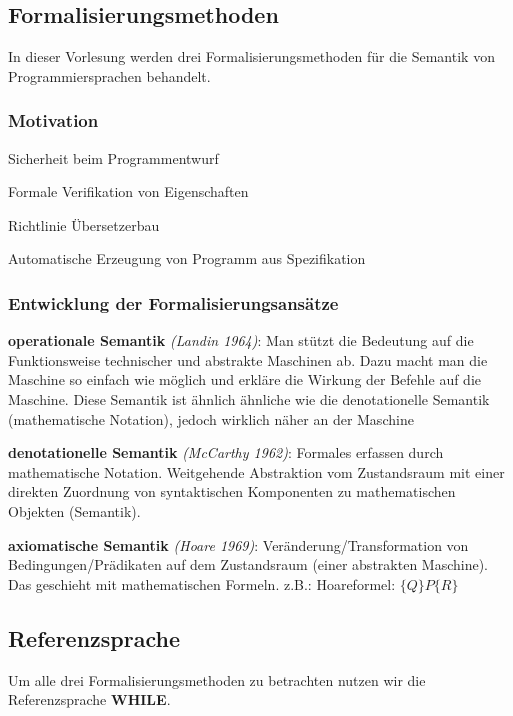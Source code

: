 \subsection{Formalisierungsmethoden}
In dieser Vorlesung werden drei Formalisierungsmethoden für die Semantik von Programmiersprachen behandelt.
\subsubsection*{Motivation}
\begin{compactitem}
	\item Sicherheit beim Programmentwurf
	\item Formale Verifikation von Eigenschaften
	\item Richtlinie Übersetzerbau
	\item Automatische Erzeugung von Programm aus Spezifikation
\end{compactitem}

\subsubsection*{Entwicklung der Formalisierungsansätze}
\begin{compactitem}
	\item [\textbf{operationale Semantik}] \emph{(Landin 1964)}:
	Man stützt die Bedeutung auf die Funktionsweise technischer und abstrakte Maschinen ab. Dazu macht man die Maschine so einfach wie möglich und erkläre die Wirkung der Befehle auf die Maschine. Diese Semantik ist ähnlich ähnliche wie die denotationelle Semantik (mathematische Notation), jedoch wirklich näher an der Maschine
	\item [\textbf{denotationelle Semantik}] \emph{(McCarthy 1962)}:
	Formales erfassen durch mathematische Notation. Weitgehende Abstraktion vom Zustandsraum mit einer direkten Zuordnung von syntaktischen Komponenten zu mathematischen Objekten (Semantik).
	\item [\textbf{axiomatische Semantik}] \emph{(Hoare 1969)}:
	Veränderung/Transformation von Bedingungen/Prädikaten auf dem Zustandsraum (einer abstrakten Maschine).
	Das geschieht mit mathematischen Formeln. z.B.: Hoareformel: $\{Q\}P\{R\}$
\end{compactitem}

\subsection{Referenzsprache}
Um alle drei Formalisierungsmethoden zu betrachten nutzen wir die Referenzsprache \textbf{WHILE}.
